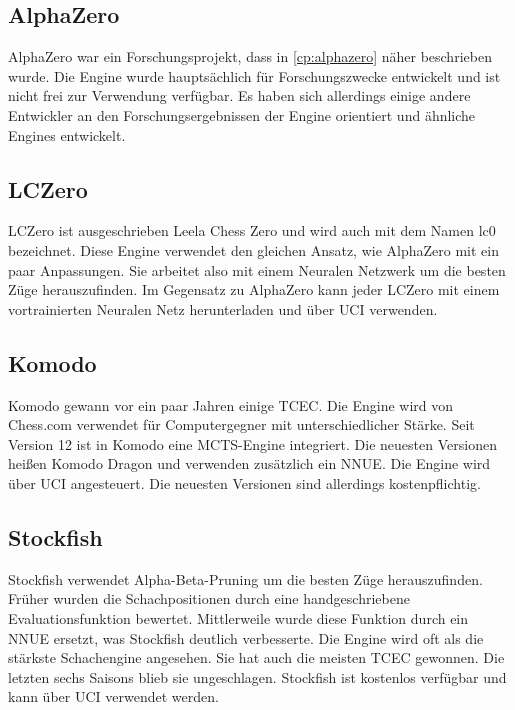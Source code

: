 \subsection{AlphaZero}
AlphaZero war ein Forschungsprojekt, dass in \autoref{cp:alphazero} näher beschrieben wurde. Die Engine wurde hauptsächlich für Forschungszwecke entwickelt und ist nicht frei zur Verwendung verfügbar. Es haben sich allerdings einige andere Entwickler an den Forschungsergebnissen der Engine orientiert und ähnliche Engines entwickelt.

\subsection{LCZero}
LCZero ist ausgeschrieben Leela Chess Zero und wird auch mit dem Namen lc0 bezeichnet. Diese Engine verwendet den gleichen Ansatz, wie AlphaZero mit ein paar Anpassungen. Sie arbeitet also mit einem Neuralen Netzwerk um die besten Züge herauszufinden. Im Gegensatz zu AlphaZero kann jeder LCZero mit einem vortrainierten Neuralen Netz herunterladen und über \ac{UCI} verwenden.
\cite{noauthor_neural_2020}

\subsection{Komodo}
Komodo gewann vor ein paar Jahren einige \ac{TCEC}. Die Engine wird von Chess.com verwendet für Computergegner mit unterschiedlicher Stärke. Seit Version 12 ist in Komodo eine \ac{MCTS}-Engine integriert. Die neuesten Versionen heißen Komodo Dragon und verwenden zusätzlich ein \ac{NNUE}. Die Engine wird über \ac{UCI} angesteuert. Die neuesten Versionen sind allerdings kostenpflichtig.
\cite{wikipedia_foundation_inc_komodo_2024}

\subsection{Stockfish}
Stockfish verwendet Alpha-Beta-Pruning um die besten Züge herauszufinden. Früher wurden die Schachpositionen durch eine handgeschriebene Evaluationsfunktion bewertet. Mittlerweile wurde diese Funktion durch ein \ac{NNUE} ersetzt, was Stockfish deutlich verbesserte. Die Engine wird oft als die stärkste Schachengine angesehen. Sie hat auch die meisten \ac{TCEC} gewonnen. Die letzten sechs Saisons blieb sie ungeschlagen. Stockfish ist kostenlos verfügbar und kann über \ac{UCI} verwendet werden.
\cite{wikipedia_foundation_inc_stockfish_2025}

